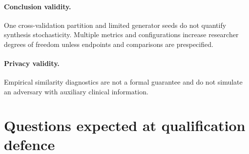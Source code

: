 \paragraph{Conclusion validity.} One cross-validation partition and limited generator seeds do not quantify synthesis stochasticity. Multiple metrics and configurations increase researcher degrees of freedom unless endpoints and comparisons are prespecified.

\paragraph{Privacy validity.} Empirical similarity diagnostics are not a formal guarantee and do not simulate an adversary with auxiliary clinical information.

\section[Defence questions]{Questions expected at qualification defence}

